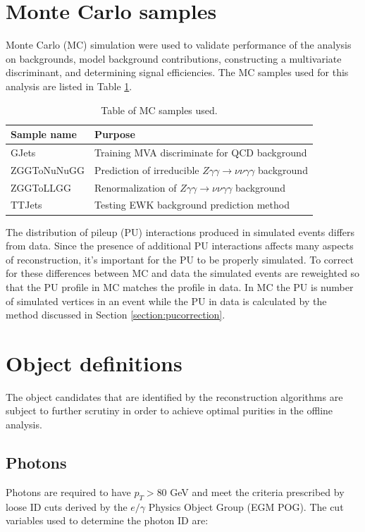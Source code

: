 \section{Monte Carlo samples}
Monte Carlo (MC) simulation were used to validate performance of the analysis on backgrounds, model background contributions, constructing a multivariate discriminant, and determining signal efficiencies.   The MC samples used for this analysis are listed in Table \ref{table:MCSamples}.
\begin{table}
	\centering
	\caption{Table of MC samples used.}
	\begin{tabular}{|l|l|}
		\hline
		Sample name & Purpose \\
		\hline
		\hline
		GJets & Training MVA discriminate for QCD background \\
		\hline
		ZGGToNuNuGG & Prediction of irreducible $Z\gamma \gamma \rightarrow \nu \nu \gamma \gamma$ background \\
		\hline
		ZGGToLLGG & Renormalization of $Z\gamma \gamma \rightarrow \nu \nu \gamma \gamma$ background \\
		\hline
		TTJets & Testing EWK background prediction method\\
		\hline
	\end{tabular}
	\label{table:MCSamples}
\end{table}

The distribution of pileup (PU) interactions produced in simulated events differs from data.  Since the presence of additional PU interactions affects many aspects of reconstruction, it's important for the PU to be properly simulated.  To correct for these differences between MC and data the simulated events are reweighted so that the PU profile in MC matches the profile in data.  In MC the PU is number of simulated vertices in an event while the PU in data is calculated by the method discussed in Section \ref{section:pucorrection}.  
  

\section{Object definitions}
The object candidates that are identified by the reconstruction algorithms are subject to further scrutiny in order to achieve optimal purities in the offline analysis.  

\subsection{Photons}
Photons are required to have $p_T>80$ GeV and meet the criteria prescribed by loose ID cuts derived by the $e/\gamma$ Physics Object Group (EGM POG).  The cut variables used to determine the photon ID are:

